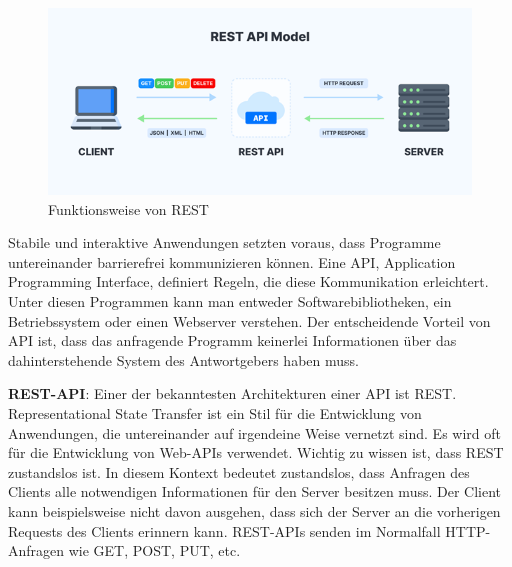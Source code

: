 \begin{figure}[h]
    \centering
    \includegraphics[scale=0.9]{sections/cloud-computing/images/rest-api.png}
    \caption{Funktionsweise von REST}
    \label{fig:ai-builder-tagging-figure}
\end{figure}

Stabile und interaktive Anwendungen setzten voraus, dass Programme untereinander barrierefrei kommunizieren können. Eine API, Application Programming Interface, definiert Regeln, die diese Kommunikation erleichtert. Unter diesen Programmen kann man entweder Softwarebibliotheken, ein Betriebssystem oder einen Webserver verstehen.
Der entscheidende Vorteil von API ist, dass das anfragende Programm keinerlei Informationen über das dahinterstehende System des Antwortgebers haben muss.

\textbf{REST-API}: Einer der bekanntesten Architekturen einer API ist REST. Representational State Transfer ist ein Stil für die Entwicklung von Anwendungen, die untereinander auf irgendeine Weise vernetzt sind. Es wird oft für die Entwicklung von Web-APIs verwendet.
Wichtig zu wissen ist, dass REST zustandslos ist. In diesem Kontext bedeutet zustandslos, dass Anfragen des Clients alle notwendigen Informationen für den Server besitzen muss. Der Client kann beispielsweise nicht davon ausgehen, dass sich der Server an die vorherigen Requests des Clients erinnern kann.
REST-APIs senden im Normalfall HTTP-Anfragen wie GET, POST, PUT, etc.
